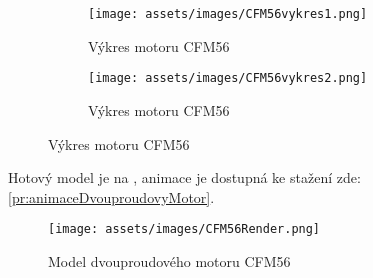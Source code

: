 \begin{figure}[H]
    \centering
    \begin{subfigure}{.5\textwidth}
        \centering
        \texttt{[image: assets/images/CFM56vykres1.png]}
        \caption{Výkres motoru CFM56}
        \label{obr:CFM56vykres1}
    \end{subfigure}%
    \begin{subfigure}{.5\textwidth}
        \centering
        \texttt{[image: assets/images/CFM56vykres2.png]}
        \caption{Výkres motoru CFM56}
        \label{obr:CFM56vykres2}
    \end{subfigure}
\end{figure}

{Hotový model je na , animace je dostupná ke stažení zde: \ref{pr:animaceDvouproudovyMotor}.}

\begin{figure}[H]
    \centering
    \texttt{[image: assets/images/CFM56Render.png]}
    \caption{Model dvouproudového motoru CFM56 \jaObr}
    \label{obr:CFM56Render}
\end{figure}